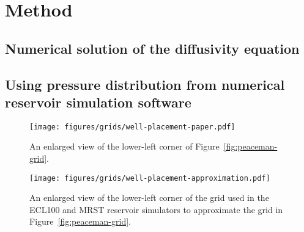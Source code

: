 
\section{Method} %
\label{sec:method}

\subsection{Numerical solution of the diffusivity equation} %
\label{sub:numerical_solution_of_the_diffusivity_equation}


\subsection{Using pressure distribution from numerical reservoir simulation software} %
\label{sub:using_pressure_distribution_from_numerical_reservoir_simulation_software}

\begin{figure}[htbp]
    \centering
    \texttt{[image: figures/grids/well-placement-paper.pdf]}
    \caption{An enlarged view of the lower-left corner of Figure~\ref{fig:peaceman-grid}.}
    \label{fig:well-placement-paper}
\end{figure}

\begin{figure}[htbp]
    \centering
    \texttt{[image: figures/grids/well-placement-approximation.pdf]}
    \caption{An enlarged view of the lower-left corner of the grid used in the ECL100 and MRST reservoir simulators to approximate the grid in Figure~\ref{fig:peaceman-grid}.}
    \label{fig:well-placement-approximation}
\end{figure}

